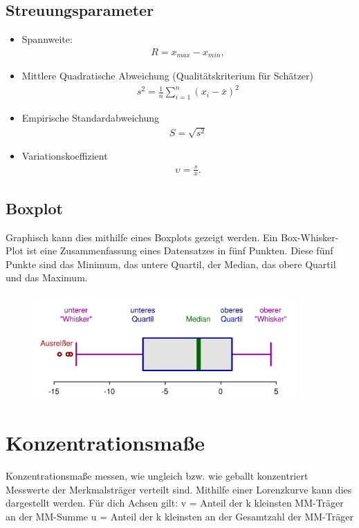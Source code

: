 \documentclass[a4paper,10pt]{scrartcl}
\begin{document}
\subsection{Streuungsparameter}

\begin{itemize}
    \item Spannweite:\begin{eqnarray}R={x}_{max}-{x}_{min},\end{eqnarray}
    \item Mittlere Quadratische Abweichung (Qualitätskriterium für Schätzer)
    \begin{eqnarray}{s}^{2}=\frac{1}{n}\displaystyle \sum_{i=1}^{n}{({x}_{i}-\overline{x})}^{2}\end{eqnarray}
    \item Empirische Standardabweichung 
    \begin{eqnarray}
    S = \sqrt{{s}^{2}}
    \end{eqnarray}
    \item Variationskoeffizient 
    \begin{eqnarray}\upsilon =\frac{s}{x}.\end{eqnarray}
\end{itemize}
\newpage
\subsection{Boxplot}
Graphisch kann dies mithilfe eines Boxplots gezeigt werden. Ein Box-Whisker-Plot ist eine Zusammenfassung eines Datensatzes in fünf Punkten. Diese fünf Punkte sind das Minimum, das untere Quartil, der Median, das obere Quartil und das Maximum.
\begin{figure}[h] 
  \centering
     \includegraphics[width=0.9\textwidth]{Boxplot.png}
  \label{fig:Bild1}
\end{figure}

\section{Konzentrationsmaße}
Konzentrationsmaße messen, wie ungleich bzw. wie geballt konzentriert Messwerte der Merkmalsträger verteilt sind. Mithilfe einer Lorenzkurve kann dies dargestellt werden. Für dich Achsen gilt:\newline
v = Anteil der k kleinsten MM-Träger an der MM-Summe\newline
u = Anteil der k kleinsten an der Gesamtzahl der MM-Träger
\end{document}
